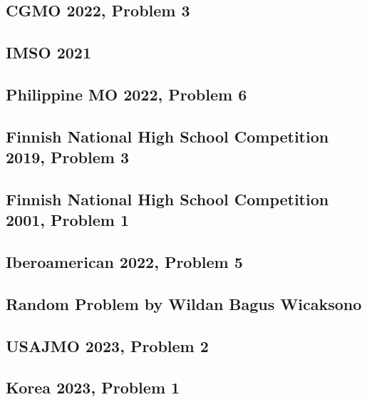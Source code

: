 \subsection{CGMO 2022, Problem 3}


\subsection{IMSO 2021}


\subsection{Philippine MO 2022, Problem 6}


\subsection{Finnish National High School Competition 2019, Problem 3}


\subsection{Finnish National High School Competition 2001, Problem 1}


\subsection{Iberoamerican 2022, Problem 5}


\subsection{Random Problem by Wildan Bagus Wicaksono}


\subsection{USAJMO 2023, Problem 2}


\subsection{Korea 2023, Problem 1}


